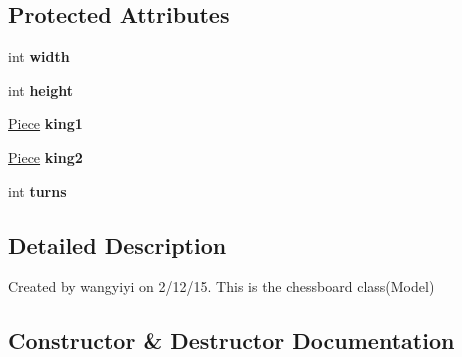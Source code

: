 \subsection*{Protected Attributes}
\begin{DoxyCompactItemize}
\item 
\hypertarget{classchessboard_1_1_chess_board_a550e6dddb19052e0b3759a2f6ced4f62}{}int {\bfseries width}\label{classchessboard_1_1_chess_board_a550e6dddb19052e0b3759a2f6ced4f62}

\item 
\hypertarget{classchessboard_1_1_chess_board_ad67be26cc8ba04f4deffe3ca7e8c2313}{}int {\bfseries height}\label{classchessboard_1_1_chess_board_ad67be26cc8ba04f4deffe3ca7e8c2313}

\item 
\hypertarget{classchessboard_1_1_chess_board_a30976a4382c751ed5f6dea0c4bab2df3}{}\hyperlink{classpiece_1_1_piece}{Piece} {\bfseries king1}\label{classchessboard_1_1_chess_board_a30976a4382c751ed5f6dea0c4bab2df3}

\item 
\hypertarget{classchessboard_1_1_chess_board_a05f244efe3c9816d81886fecb0de109a}{}\hyperlink{classpiece_1_1_piece}{Piece} {\bfseries king2}\label{classchessboard_1_1_chess_board_a05f244efe3c9816d81886fecb0de109a}

\item 
\hypertarget{classchessboard_1_1_chess_board_a2c230cbaa43e859ce5c455d71f2ca1a9}{}int {\bfseries turns}\label{classchessboard_1_1_chess_board_a2c230cbaa43e859ce5c455d71f2ca1a9}

\end{DoxyCompactItemize}


\subsection{Detailed Description}
Created by wangyiyi on 2/12/15. This is the chessboard class(\+Model) 

\subsection{Constructor \& Destructor Documentation}
\hypertarget{classchessboard_1_1_chess_board_a38aa6904871b6262948c855ade0eca00}{}

